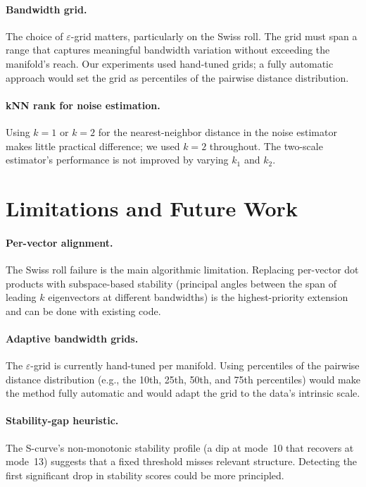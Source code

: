\documentclass{article}
\begin{document}
\paragraph{Bandwidth grid.} The choice of $\varepsilon$-grid matters, particularly on the Swiss roll. The grid must span a range that captures meaningful bandwidth variation without exceeding the manifold's reach. Our experiments used hand-tuned grids; a fully automatic approach would set the grid as percentiles of the pairwise distance distribution.

\paragraph{kNN rank for noise estimation.} Using $k = 1$ or $k = 2$ for the nearest-neighbor distance in the noise estimator makes little practical difference; we used $k = 2$ throughout. The two-scale estimator's performance is not improved by varying $k_1$ and $k_2$.

\section{Limitations and Future Work}
\label{sec:limitations}

\paragraph{Per-vector alignment.} The Swiss roll failure is the main algorithmic limitation. Replacing per-vector dot products with subspace-based stability (principal angles between the span of leading $k$ eigenvectors at different bandwidths) is the highest-priority extension and can be done with existing code.

\paragraph{Adaptive bandwidth grids.} The $\varepsilon$-grid is currently hand-tuned per manifold. Using percentiles of the pairwise distance distribution (e.g., the 10th, 25th, 50th, and 75th percentiles) would make the method fully automatic and would adapt the grid to the data's intrinsic scale.

\paragraph{Stability-gap heuristic.} The S-curve's non-monotonic stability profile (a dip at mode~10 that recovers at mode~13) suggests that a fixed threshold misses relevant structure. Detecting the first significant drop in stability scores could be more principled.
\end{document}
